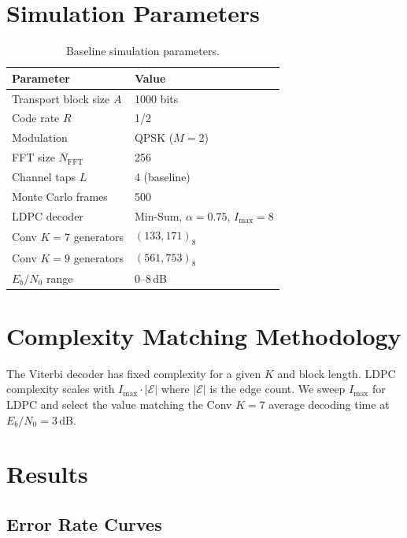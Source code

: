 \documentclass[12pt, a4paper]{article}
\begin{document}
\section{Simulation Parameters}

\begin{table}[H]
\centering
\caption{Baseline simulation parameters.}
\begin{tabular}{@{}ll@{}}
\toprule
Parameter & Value \\
\midrule
Transport block size $A$ & 1000 bits \\
Code rate $R$ & 1/2 \\
Modulation & QPSK ($M=2$) \\
FFT size $N_{\text{FFT}}$ & 256 \\
Channel taps $L$ & 4 (baseline) \\
Monte Carlo frames & 500 \\
LDPC decoder & Min-Sum, $\alpha=0.75$, $I_{\max}=8$ \\
Conv $K=7$ generators & $(133,171)_8$ \\
Conv $K=9$ generators & $(561,753)_8$ \\
$E_b/N_0$ range & 0--8\,dB \\
\bottomrule
\end{tabular}
\end{table}

\section{Complexity Matching Methodology}
The Viterbi decoder has fixed complexity for a given $K$ and block length. LDPC complexity scales with $I_{\max}\cdot|\mathcal{E}|$ where $|\mathcal{E}|$ is the edge count. We sweep $I_{\max}$ for LDPC and select the value matching the Conv $K=7$ average decoding time at $E_b/N_0 = 3$\,dB.

\section{Results}
\subsection{Error Rate Curves}
\end{document}
